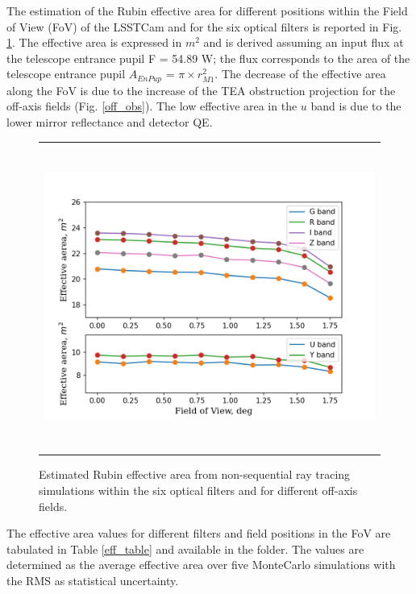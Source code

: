 \documentclass[SE,authoryear,toc]{lsstdoc}
\begin{document}
The estimation of the Rubin effective area for different positions within the Field of View (FoV) of the LSSTCam and for the six optical filters is reported in Fig. \ref{eff}. The effective area is expressed in $m^2$ and is derived assuming an input flux at the telescope entrance pupil F = 54.89 W; the flux corresponds to the area of the telescope entrance pupil $A_{EnPup}$ = $\pi\times r_{M1}^2$. The decrease of the effective area along the FoV is due to the increase of the TEA obstruction projection for the off-axis fields (Fig. \ref{off_obs}). The low effective area in the $u$ band is due to the lower mirror reflectance and detector QE.


\begin{figure}
\begin{center}
\begin{tabular}{c}
\includegraphics[height=10cm]{Rubin_effective_area_TEA_cad}
\end{tabular}
\end{center}
\caption 
{ \label{eff} Estimated Rubin effective area from non-sequential ray tracing simulations within the six optical filters and for different off-axis fields.}
\end{figure} 



The effective area values for different filters and field positions in the FoV are tabulated in Table \ref{eff_table} and available in the \cite{sitcom} folder. The values are determined as the average effective area over five MonteCarlo simulations with the RMS as statistical uncertainty.  
\end{document}

